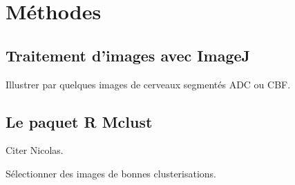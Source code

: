 \section{M\'ethodes}

\subsection{Traitement d'images avec ImageJ}

Illustrer par quelques images de cerveaux segment\'es ADC ou CBF.

\subsection{Le paquet R Mclust}%

Citer Nicolas.

S\'electionner des images de bonnes clusterisations.

\subsection{}%

